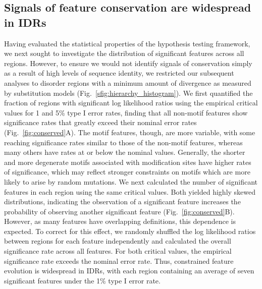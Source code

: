 \subsection{Signals of feature conservation are widespread in IDRs}
Having evaluated the statistical properties of the hypothesis testing framework, we next sought to investigate the distribution of significant features across all regions. However, to ensure we would not identify signals of conservation simply as a result of high levels of sequence identity, we restricted our subsequent analyses to disorder regions with a minimum amount of divergence as measured by substitution models (Fig.~\ref{sfig:hierarchy_histogram}). We first quantified the fraction of regions with significant log likelihood ratios using the empirical critical values for 1 and 5\% type I error rates, finding that all non-motif features show significance rates that greatly exceed their nominal error rates (Fig.~\ref{fig:conserved}A). The motif features, though, are more variable, with some reaching significance rates similar to those of the non-motif features, whereas many others have rates at or below the nominal values. Generally, the shorter and more degenerate motifs associated with modification sites have higher rates of significance, which may reflect stronger constraints on motifs which are more likely to arise by random mutations. We next calculated the number of significant features in each region using the same critical values. Both yielded highly skewed distributions, indicating the observation of a significant feature increases the probability of observing another significant feature (Fig.~\ref{fig:conserved}B). However, as many features have overlapping definitions, this dependence is expected. To correct for this effect, we randomly shuffled the log likelihood ratios between regions for each feature independently and calculated the overall significance rate across all features. For both critical values, the empirical significance rate exceeds the nominal error rate. Thus, constrained feature evolution is widespread in IDRs, with each region containing an average of seven significant features under the 1\% type I error rate.

